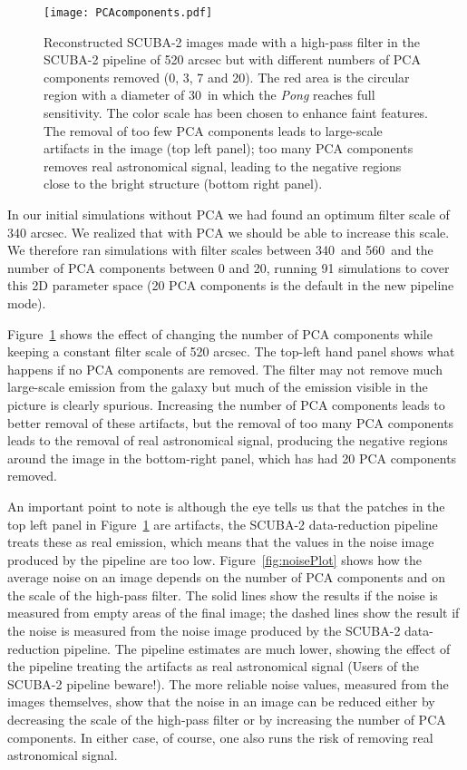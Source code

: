 \documentclass[a4paper,fleqn,usenatbib, twocolumn]{aastex63}
\begin{document}
\begin{figure}
  \centering
  \texttt{[image: PCAcomponents.pdf]}
  \caption{Reconstructed SCUBA-2 images made with a high-pass filter in the SCUBA-2
  pipeline of 520 arcsec but with different numbers of PCA components removed
  (0, 3, 7 and 20). The red area is the circular region with a diameter
  of 30\arcmin\ in which the {\it Pong} reaches full sensitivity. The color
  scale has been chosen to enhance faint features. The removal of
  too few PCA components leads to large-scale artifacts in the image (top left panel); too many
  PCA components removes real astronomical signal, leading to the
  negative regions close to the bright structure (bottom right panel).
 }
  \label{fig:PCAcomp}
\end{figure}

In our initial simulations without PCA we had found an optimum filter scale
of 340 arcsec. We realized that with PCA we should be able to increase this scale.
We therefore ran simulations with filter scales between 340\arcsec\ and 560\arcsec\
and the number of PCA components between 0 and 20, running 91 simulations
to cover this 2D parameter space (20 PCA components is the default in the new pipeline mode).

Figure~\ref{fig:PCAcomp} shows the effect of changing the number of PCA components 
while keeping a constant filter scale of 520 arcsec. The top-left hand panel shows
what happens if no PCA components are removed. The filter may not remove
much large-scale emission from the galaxy but much of the emission visible
in the picture is clearly spurious. Increasing the number of PCA components leads to better removal of these artifacts, but the removal of too many PCA components
leads to the removal of real astronomical signal, producing the negative regions around
the image in the bottom-right panel, which has had 20 PCA components removed.

An important point to note is although the eye tells us that
the patches in the top left panel in Figure~\ref{fig:PCAcomp} are artifacts, the SCUBA-2
data-reduction pipeline treats these as real emission, which means that
the values in the noise image produced by the pipeline are too low.
Figure~\ref{fig:noisePlot} shows how the average noise on an image depends on the
number of PCA components and on the scale of the 
high-pass filter. The solid lines show the results if the noise is measured
from empty areas of the final image; the dashed lines show the result
if the noise is measured from the noise image produced by the SCUBA-2 data-reduction
pipeline. The pipeline estimates are much lower, showing the effect of the pipeline
treating the artifacts as real astronomical signal (Users
of the SCUBA-2 pipeline beware!). The more reliable noise values, measured from the images themselves, show that the noise in an image can be reduced either by
decreasing the scale of the high-pass filter or by increasing the number of PCA
components. In either case, of course, one also runs the risk of removing real
astronomical signal.
\end{document}
